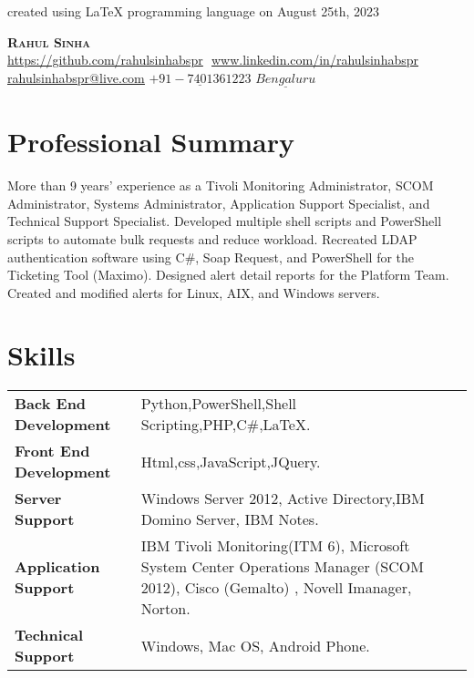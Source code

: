 \documentclass[letterpaper,10.5 pt]{article}
\begin{document}
	
	\begin{flushright}
		\color{gray}
		\item
		created using LaTeX programming language on August 25th, 2023
	\end{flushright}
	
		
	\begin{center}
		\textbf{\Huge \scshape Rahul Sinha} \\ \vspace{8pt}
		\small
		\href{https://github.com/rahulsinhabspr}{\underline{https://github.com/rahulsinhabspr}} $  $
		\href{www.linkedin.com/in/rahulsinhabspr}{\underline{www.linkedin.com/in/rahulsinhabspr}} $  $
		\href{mailto:rahulsinhabspr@live.com}
		{\underline{rahulsinhabspr@live.com}}
		\newline
		{$\underline{+91-7401361223}$}
		{$\underline{Bengaluru}$}
	\end{center}
	
	\section{Professional Summary}
	More than 9 years' experience as a Tivoli Monitoring Administrator, SCOM Administrator, Systems Administrator, Application Support Specialist, and Technical Support Specialist. Developed multiple shell scripts and PowerShell scripts to automate bulk requests and reduce workload. Recreated LDAP authentication software using C\#, Soap Request, and PowerShell for the Ticketing Tool (Maximo). Designed alert detail reports for the Platform Team. Created and modified alerts for Linux, AIX, and Windows servers. \\
	
	\section{Skills}
	\begin{tabular}{ m{0.23\paperwidth}  m{0.65\paperwidth}  } 
			
			\textbf{Back End Development} & Python,PowerShell,Shell Scripting,PHP,C\#,LaTeX.  \\ 
			
			\textbf{Front End Development} & Html,css,JavaScript,JQuery. \\
			
			\textbf{Server Support} & Windows Server 2012, Active Directory,IBM Domino Server, IBM Notes. \\
			
			\textbf{Application Support} & IBM Tivoli Monitoring(ITM 6), Microsoft System Center Operations Manager (SCOM 2012), Cisco (Gemalto) , Novell Imanager, Norton. \\ 
			
			\textbf{Technical Support} & Windows, Mac OS, Android Phone. \\ 
			
		\end{tabular}
	
\end{document}
